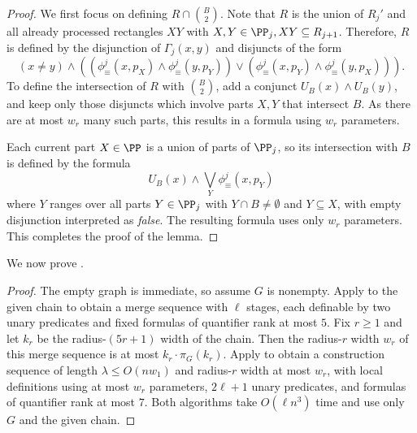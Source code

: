 \begin{proof}
\medskip
We first focus on defining $R\cap {B\choose 2}$.
Note that $R$
is the union of $R_j'$
and all already processed rectangles $XY$ with $X,Y\in\PP_j, XY\subseteq R_{j+1}$.
Therefore, $R$ is defined by the disjunction
of $\Gamma_j(x,y)$ and disjuncts of the form
\[
 (x\neq y)\land \left((\phi_\equiv^{j}(x,p_X)\land\phi_\equiv^{j}(y,p_Y))
 \lor
 (\phi_\equiv^{j}(x,p_Y)\land\phi_\equiv^{j}(y,p_X))\right).
\]
To define the intersection of $R$ with $B\choose 2$,
add a conjunct $U_B(x)\land U_B(y)$,
and keep only those disjuncts which involve parts $X,Y$ that intersect $B$. As there are at most $w_r$ many such parts, this results in a formula
 using $w_r$ parameters.

Each current part $X\in\PP$ is a union of parts of $\PP_j$, so its intersection with $B$ is defined by
the formula
$$U_B(x)\land \bigvee_{Y}\phi_\equiv^{j}(x,p_Y)$$ where $Y$ ranges over all parts $Y\in\PP_j$ with $Y\cap B\neq\emptyset$ and $Y\subseteq X$, with empty disjunction interpreted as \emph{false}.
The resulting formula uses only $w_r$ parameters.
This completes the proof of the lemma.
\end{proof}

We now prove .
\lembetterdefinablemwfromsets*

\begin{proof}
    The empty graph is immediate, so assume $G$ is nonempty.
    Apply  to the given chain to obtain a merge sequence with $\ell$ stages, each definable by two unary predicates and fixed formulas of quantifier rank at most $5$.
    Fix $r\ge 1$ and let $k_r$ be the radius-$(5r+1)$ width of the chain.
    Then the radius-$r$ width $w_r$ of this merge sequence is at most $k_r\cdot \pi_G(k_r)$. Apply  to obtain a construction sequence of length $\lambda\le O(nw_1)$ and radius-$r$ width at most $w_r$, with local definitions using at most $w_r$ parameters, $2\ell+1$ unary predicates, and formulas of quantifier rank at most $7$.
    Both algorithms take $O(\ell n^3)$ time and use only $G$ and the given chain.
\end{proof}
